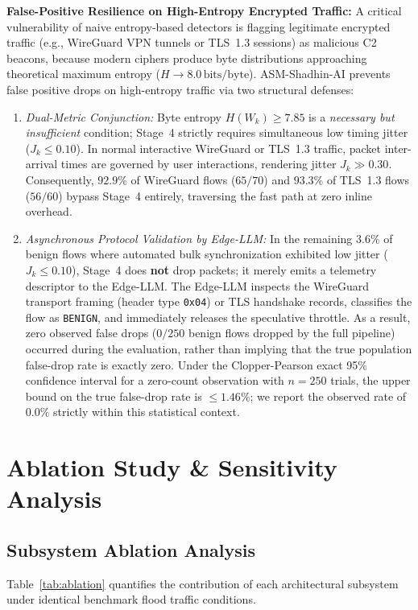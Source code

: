 \documentclass{ieeeaccess}
\renewcommand{\_}{\textunderscore\allowbreak}
\begin{document}
\textbf{False-Positive Resilience on High-Entropy Encrypted Traffic:}
A critical vulnerability of naive entropy-based detectors is flagging legitimate encrypted traffic (e.g., WireGuard VPN tunnels or TLS~1.3 sessions) as malicious C2 beacons, because modern ciphers produce byte distributions approaching theoretical maximum entropy ($H \to 8.0\,\text{bits/byte}$). ASM-Shadhin-AI prevents false positive drops on high-entropy traffic via two structural defenses:
\begin{enumerate}
  \item \textit{Dual-Metric Conjunction:} Byte entropy $H(W_k) \ge 7.85$ is a \emph{necessary but insufficient} condition; Stage~4 strictly requires simultaneous low timing jitter ($J_k \le 0.10$). In normal interactive WireGuard or TLS~1.3 traffic, packet inter-arrival times are governed by user interactions, rendering jitter $J_k \gg 0.30$. Consequently, $92.9\%$ of WireGuard flows ($65/70$) and $93.3\%$ of TLS~1.3 flows ($56/60$) bypass Stage~4 entirely, traversing the fast path at zero inline overhead.
  \item \textit{Asynchronous Protocol Validation by Edge-LLM:} In the remaining
    $3.6\%$ of benign flows where automated bulk synchronization exhibited low
    jitter ($J_k \le 0.10$), Stage~4 does \textbf{not} drop packets; it merely
    emits a telemetry descriptor to the Edge-LLM. The Edge-LLM inspects the
    WireGuard transport framing (header type \texttt{0x04}) or TLS handshake
    records, classifies the flow as \texttt{BENIGN}, and immediately releases
    the speculative throttle. As a result, zero observed false drops ($0/250$ benign flows dropped by the full pipeline)
    occurred during the evaluation, rather than implying that the true population false-drop rate is exactly zero.
    Under the Clopper-Pearson exact 95\% confidence interval for a zero-count
    observation with $n=250$ trials, the upper bound on the true false-drop rate
    is $\le 1.46\%$; we report the observed rate of $0.0\%$ strictly within this
    statistical context.
\end{enumerate}

\section{Ablation Study \& Sensitivity Analysis}
\subsection{Subsystem Ablation Analysis}
Table~\ref{tab:ablation} quantifies the contribution of each architectural subsystem under identical benchmark flood traffic conditions.
\end{document}
